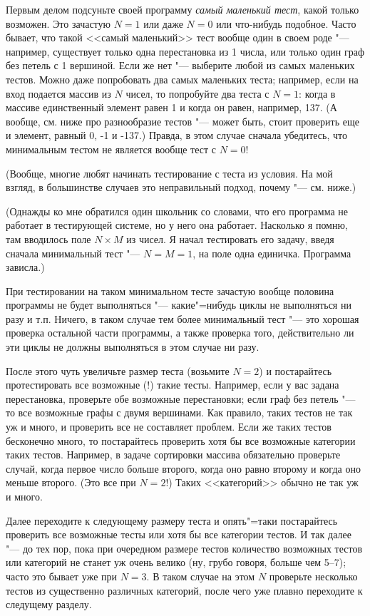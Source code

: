 \documentclass[a4paper,10pt]{problems}
\begin{document}
Первым делом подсуньте своей программу \textit{самый маленький тест}, какой только возможен. Это зачастую $N=1$ или даже $N=0$ или что-нибудь подобное. Часто бывает, что такой <<самый маленький>> тест вообще один в своем роде "--- например, существует только одна перестановка из 1 числа, или только один граф без петель с 1 вершиной. Если же нет "--- выберите любой из самых маленьких тестов. Можно даже попробовать два самых маленьких теста; например, если на вход подается массив из $N$ чисел, то попробуйте два теста с $N=1$: когда в массиве единственный элемент равен 1 и когда он равен, например, 137. (А вообще, см. ниже про разнообразие тестов "--- может быть, стоит проверить еще и элемент, равный 0, -1 и -137.) Правда, в этом случае сначала убедитесь, что минимальным тестом не является вообще тест с $N=0$!

(Вообще, многие любят начинать тестирование с теста из условия. На мой взгляд, в большинстве случаев это неправильный подход, почему "--- см. ниже.)

(Однажды ко мне обратился один школьник со словами, что его программа не работает в тестирующей системе, но у него она работает.
Насколько я помню, там вводилось поле $N\times M$ из чисел. 
Я начал тестировать его задачу, введя сначала минимальный тест "--- $N=M=1$, на поле одна единичка. 
Программа зависла.)

При тестировании на таком минимальном тесте зачастую вообще половина программы не будет выполняться "--- какие"=нибудь циклы не выполняться ни разу и т.п.
Ничего, в таком случае тем более минимальный тест "--- это хорошая проверка остальной части программы,
а также проверка того, действительно ли эти циклы не должны выполняться в этом случае ни разу.

После этого чуть увеличьте размер теста (возьмите $N=2$) и постарайтесь протестировать все возможные (!) такие тесты. 
Например, если у вас задана перестановка, проверьте обе возможные перестановки; если граф без петель "--- то все возможные графы с двумя вершинами. 
Как правило, таких тестов не так уж и много, и проверить все не составляет проблем. 
Если же таких тестов бесконечно много, то постарайтесь проверить хотя бы все возможные категории таких тестов. 
Например, в задаче сортировки массива обязательно проверьте случай, когда первое число больше второго, когда оно равно второму и когда оно меньше второго. 
(Это все при $N=2$!) Таких <<категорий>> обычно не так уж и много.

Далее переходите к следующему размеру теста и опять"=таки постарайтесь проверить все возможные тесты или хотя бы все категории тестов. И так далее "--- до тех пор, пока при очередном размере тестов количество возможных тестов или категорий не станет уж очень велико (ну, грубо говоря, больше чем 5--7); часто это бывает уже при $N=3$. В таком случае на этом $N$ проверьте несколько тестов из существенно различных категорий, после чего уже плавно переходите к следущему разделу.
\end{document}
